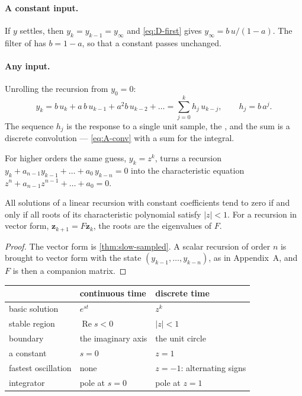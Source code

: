 \paragraph{A constant input.} If $y$ settles, then $y_k = y_{k-1} = y_\infty$ and \cref{eq:D-first} gives $y_\infty = b\,u/(1 - a)$. The filter of  has $b = 1 - a$, so that a constant passes unchanged.

\paragraph{Any input.} Unrolling the recursion from $y_0 = 0$:
\begin{equation}
  y_k = b\,u_k + a\,b\,u_{k-1} + a^2b\,u_{k-2} + \dots = \sum_{j=0}^{k} h_j\,u_{k-j}, \qquad h_j = b\,a^j .
\end{equation}
The sequence $h_j$ is the response to a single unit sample, the , and the sum is a discrete convolution — \cref{eq:A-conv} with a sum for the integral.

For higher orders the same guess, $y_k = z^k$, turns a recursion $y_k + a_{n-1}y_{k-1} + \dots + a_0\,y_{k-n} = 0$ into the characteristic equation $z^n + a_{n-1}z^{n-1} + \dots + a_0 = 0$.

\begin{theorem}
\label{thm:D-stable}
All solutions of a linear recursion with constant coefficients tend to zero if and only if all roots of its characteristic polynomial satisfy $|z| < 1$. For a recursion in vector form, $\symbf z_{k+1} = F\symbf z_k$, the roots are the eigenvalues of $F$.
\end{theorem}
\begin{proof}
The vector form is \cref{thm:slow-sampled}. A scalar recursion of order $n$ is brought to vector form with the state $(y_{k-1}, \dots, y_{k-n})$, as in Appendix~A, and $F$ is then a companion matrix.
\end{proof}

\begin{keyidea}
\begin{center}\small
\renewcommand{\arraystretch}{1.3}
\begin{tabular}{@{}lll@{}}
 & continuous time & discrete time\\
\midrule
basic solution & $e^{st}$ & $z^k$\\
stable region & $\operatorname{Re}s < 0$ & $|z| < 1$\\
boundary & the imaginary axis & the unit circle\\
a constant & $s = 0$ & $z = 1$\\
fastest oscillation & none & $z = -1$: alternating signs\\
integrator & pole at $s = 0$ & pole at $z = 1$\\
\end{tabular}
\end{center}
\end{keyidea}

